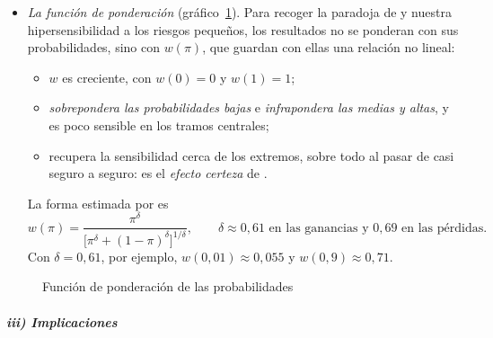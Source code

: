 \documentclass[11pt]{article}
\begin{document}
\begin{itemize}
\item \emph{La función de ponderación} (gráfico~\ref{fig:ponderacion}). Para recoger la paradoja de  y nuestra hipersensibilidad a los riesgos pequeños, los resultados no se ponderan con sus probabilidades, sino con  $w(\pi)$, que guardan con ellas una relación no lineal:
  \begin{itemize}
  \item $w$ es creciente, con $w(0)=0$ y $w(1)=1$;
  \item \emph{sobrepondera las probabilidades bajas} e \emph{infrapondera las medias y altas}, y es poco sensible en los tramos centrales;
  \item recupera la sensibilidad cerca de los extremos, sobre todo al pasar de casi seguro a seguro: es el \emph{efecto certeza} de .
  \end{itemize}
  La forma estimada por \textcite{TverskyKahneman1992Advances} es
  \begin{equation}\label{eq:ponderacion}
  w(\pi)=\frac{\pi^{\delta}}{\big[\pi^{\delta}+(1-\pi)^{\delta}\big]^{1/\delta}},\qquad\delta\approx 0{,}61 \text{ en las ganancias y } 0{,}69 \text{ en las pérdidas}.
  \end{equation}
  Con $\delta=0{,}61$, por ejemplo, $w(0{,}01)\approx 0{,}055$ y $w(0{,}9)\approx 0{,}71$.
\end{itemize}

\begin{figure}[H]
\centering
\caption{Función de ponderación de las probabilidades}\label{fig:ponderacion}
\end{figure}

\subparagraph{iii) Implicaciones}
\end{document}
